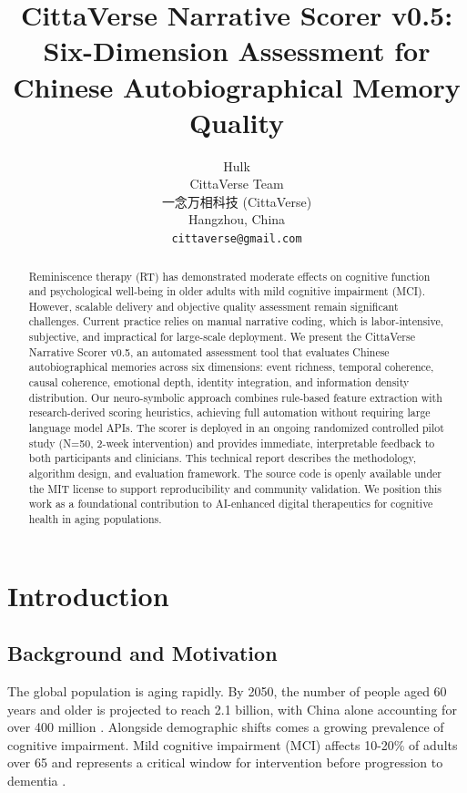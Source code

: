 \documentclass[11pt]{article}
\title{CittaVerse Narrative Scorer v0.5: Six-Dimension Assessment for Chinese Autobiographical Memory Quality}
\author{
  Hulk \\
  CittaVerse Team \\
  一念万相科技 (CittaVerse) \\
  Hangzhou, China \\
  \texttt{cittaverse@gmail.com} \\
}
\begin{document}
\maketitle

\begin{abstract}
Reminiscence therapy (RT) has demonstrated moderate effects on cognitive function and psychological well-being in older adults with mild cognitive impairment (MCI). However, scalable delivery and objective quality assessment remain significant challenges. Current practice relies on manual narrative coding, which is labor-intensive, subjective, and impractical for large-scale deployment. We present the CittaVerse Narrative Scorer v0.5, an automated assessment tool that evaluates Chinese autobiographical memories across six dimensions: event richness, temporal coherence, causal coherence, emotional depth, identity integration, and information density distribution. Our neuro-symbolic approach combines rule-based feature extraction with research-derived scoring heuristics, achieving full automation without requiring large language model APIs. The scorer is deployed in an ongoing randomized controlled pilot study (N=50, 2-week intervention) and provides immediate, interpretable feedback to both participants and clinicians. This technical report describes the methodology, algorithm design, and evaluation framework. The source code is openly available under the MIT license to support reproducibility and community validation. We position this work as a foundational contribution to AI-enhanced digital therapeutics for cognitive health in aging populations.
\end{abstract}

\section{Introduction}

\subsection{Background and Motivation}

The global population is aging rapidly. By 2050, the number of people aged 60 years and older is projected to reach 2.1 billion, with China alone accounting for over 400 million \cite{un2019}. Alongside demographic shifts comes a growing prevalence of cognitive impairment. Mild cognitive impairment (MCI) affects 10-20\% of adults over 65 and represents a critical window for intervention before progression to dementia \cite{petersen2018}.
\end{document}
